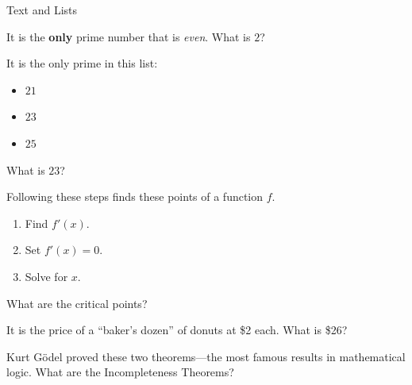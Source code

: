 \documentclass{article}
\begin{document}
\begin{category}{Text and Lists}

  \begin{clue}[say]
    It is the \textbf{only} prime number that is \emph{even}.
  \response
    What is $2$?
  \end{clue}

  \begin{clue}[say]
    It is the only prime in this list:
    \begin{itemize}
      \item $21$
      \item $23$
      \item $25$
    \end{itemize}
  \response
    What is $23$?
  \end{clue}

  \begin{clue}[say]
    Following these steps finds these points of a function $f.$
    \begin{enumerate}
      \item Find $f'(x).$
      \item Set $f'(x) = 0.$
      \item Solve for $x.$
    \end{enumerate}
  \response
    What are the critical points?
  \end{clue}

  \begin{clue}[say]
    It is the price of a ``baker's dozen'' of donuts at \$2 each.
  \response
    What is \$26?
  \end{clue}

  \begin{clue}[say]
    Kurt G\"odel proved these two theorems---the most famous results in
    mathematical logic.
  \response
    What are the Incompleteness Theorems?
  \end{clue}

\end{category}
\end{document}
